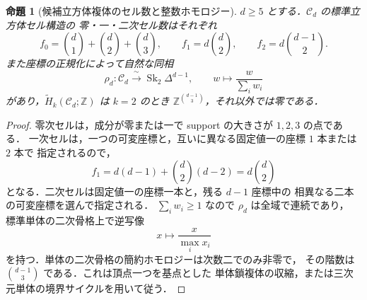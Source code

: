\documentclass[a4paper,11pt]{ltjsarticle}
\numberwithin{equation}{section}
\theoremstyle{plain}
\newtheorem{proposition}[proposition]{命題}
\theoremstyle{definition}
\theoremstyle{remark}
\newcommand{\Cd}{\mathcal C_d}
\begin{document}
\begin{proposition}[候補立方体複体のセル数と整数ホモロジー]\label{prop:degree-d-cubical-topology}
$d\ge5$ とする．$\Cd$ の標準立方体セル構造の
零・一・二次セル数はそれぞれ
\[
 f_0=\binom d1+\binom d2+\binom d3,\qquad
 f_1=d\binom d2,\qquad
 f_2=d\binom{d-1}{2}.
\]
また座標の正規化によって自然な同相
\[
 \rho_d:\Cd\xrightarrow{\;\sim\;}\operatorname{Sk}_2\Delta^{d-1},
 \qquad w\longmapsto\frac{w}{\sum_iw_i}
\]
があり，$\widetilde H_k(\Cd;\mathbb Z)$ は $k=2$ のとき
$\mathbb Z^{\binom{d-1}{3}}$，それ以外では零である．
\end{proposition}
\begin{proof}
零次セルは，成分が零または一で support の大きさが $1,2,3$ の点である．
一次セルは，一つの可変座標と，互いに異なる固定値一の座標 $1$ 本または $2$ 本で
指定されるので，
\[
 f_1=d(d-1)+\binom d2(d-2)=d\binom d2
\]
となる．二次セルは固定値一の座標一本と，残る $d-1$ 座標中の
相異なる二本の可変座標を選んで指定される．
$\sum_iw_i\ge1$ なので $\rho_d$ は全域で連続であり，
標準単体の二次骨格上で逆写像
\[
 x\longmapsto \frac{x}{\max_i x_i}
\]
を持つ．単体の二次骨格の簡約ホモロジーは次数二でのみ非零で，
その階数は $\binom{d-1}{3}$ である．これは頂点一つを基点とした
単体鎖複体の収縮，または三次元単体の境界サイクルを用いて従う．
\end{proof}
\end{document}
